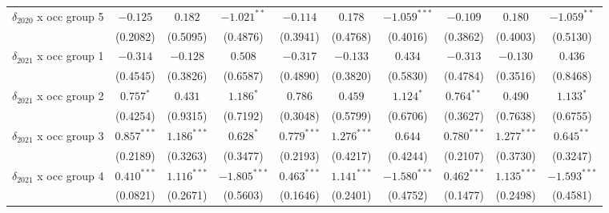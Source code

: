 \begin{tabular}{l|ccc|ccc|ccc|}
$\delta_{2020}$ x occ group 5          &                $-0.125$ &         $0.182$ &   $-1.021^{**}$ &                 $-0.114$ &         $0.178$ &  $-1.059^{***}$ &                 $-0.109$ &         $0.180$ &   $-1.059^{**}$ \\
                                       &                (0.2082) &        (0.5095) &        (0.4876) &                 (0.3941) &        (0.4768) &        (0.4016) &                 (0.3862) &        (0.4003) &        (0.5130) \\
$\delta_{2021}$ x occ group 1          &                $-0.314$ &        $-0.128$ &         $0.508$ &                 $-0.317$ &        $-0.133$ &         $0.434$ &                 $-0.313$ &        $-0.130$ &         $0.436$ \\
                                       &                (0.4545) &        (0.3826) &        (0.6587) &                 (0.4890) &        (0.3820) &        (0.5830) &                 (0.4784) &        (0.3516) &        (0.8468) \\
$\delta_{2021}$ x occ group 2          &               $0.757^*$ &         $0.431$ &       $1.186^*$ &                  $0.786$ &         $0.459$ &       $1.124^*$ &             $0.764^{**}$ &         $0.490$ &       $1.133^*$ \\
                                       &                (0.4254) &        (0.9315) &        (0.7192) &                 (0.3048) &        (0.5799) &        (0.6706) &                 (0.3627) &        (0.7638) &        (0.6755) \\
$\delta_{2021}$ x occ group 3          &           $0.857^{***}$ &   $1.186^{***}$ &       $0.628^*$ &            $0.779^{***}$ &   $1.276^{***}$ &         $0.644$ &            $0.780^{***}$ &   $1.277^{***}$ &    $0.645^{**}$ \\
                                       &                (0.2189) &        (0.3263) &        (0.3477) &                 (0.2193) &        (0.4217) &        (0.4244) &                 (0.2107) &        (0.3730) &        (0.3247) \\
$\delta_{2021}$ x occ group 4          &           $0.410^{***}$ &   $1.116^{***}$ &  $-1.805^{***}$ &            $0.463^{***}$ &   $1.141^{***}$ &  $-1.580^{***}$ &            $0.462^{***}$ &   $1.135^{***}$ &  $-1.593^{***}$ \\
                                       &                (0.0821) &        (0.2671) &        (0.5603) &                 (0.1646) &        (0.2401) &        (0.4752) &                 (0.1477) &        (0.2498) &        (0.4581) \\

\end{tabular}
